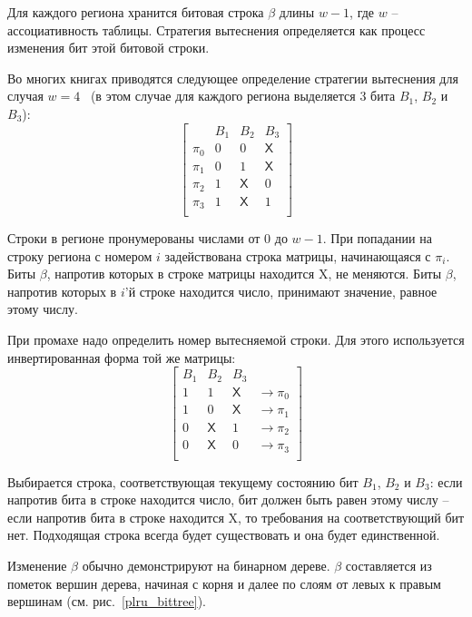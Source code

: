Для каждого региона хранится битовая строка $\beta$ длины $w-1$, где $w$ --
ассоциативность таблицы. Стратегия вытеснения определяется как процесс изменения
бит этой битовой строки.

Во многих книгах приводятся следующее определение стратегии
вытеснения \PseudoLRU для случая
$w=4$~\cite{FundamentalOfComputerOrganizationAndDesign} (в этом
случае для каждого региона выделяется 3 бита $B_1$, $B_2$ и $B_3$):
$$ \left[
  \begin{array}{c|ccc}
          & B_1 & B_2 & B_3 \\ \hline
    \pi_0 & 0 & 0 & \textsf{X} \\
    \pi_1 & 0 & 1 & \textsf{X} \\
    \pi_2 & 1 & \textsf{X} & 0 \\
    \pi_3 & 1 & \textsf{X} & 1 \\
  \end{array}
\right]
$$

Строки в регионе пронумерованы числами от 0 до $w-1$. При попадании на строку
региона с номером $i$ задействована строка матрицы, начинающаяся с $\pi_i$. Биты
$\beta$, напротив которых в строке матрицы находится \textsf{X}, не меняются.
Биты $\beta$, напротив которых в $i$'й строке находится число, принимают
значение, равное этому числу.

При промахе надо определить номер вытесняемой строки. Для этого используется
инвертированная форма той же матрицы:
$$
\left[
  \begin{array}{ccc|c}
    B_1 & B_2 & B_3 & \\ \hline
    1 & 1 & \textsf{X} & \rightarrow \pi_0 \\
    1 & 0 & \textsf{X} & \rightarrow \pi_1 \\
    0 & \textsf{X} & 1 & \rightarrow \pi_2 \\
    0 & \textsf{X} & 0 & \rightarrow \pi_3 \\
  \end{array}
\right]
$$

Выбирается строка, соответствующая текущему состоянию бит $B_1$,
$B_2$ и $B_3$: если напротив бита в строке находится число, бит
должен быть равен этому числу -- если напротив бита в строке
находится \textsf{X}, то требования на соответствующий бит нет.
Подходящая строка всегда будет существовать и она будет
единственной.

Изменение $\beta$ обычно демонстрируют на бинарном дереве. $\beta$ составляется из пометок вершин дерева, начиная с корня и далее по слоям от левых к правым вершинам (см.
рис.~\ref{plru_bittree}).

